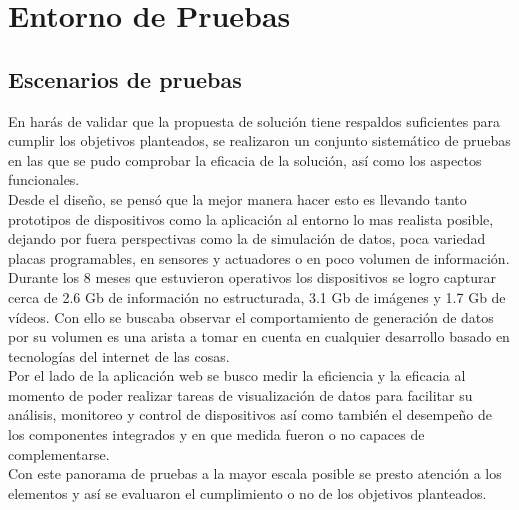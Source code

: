 

\chapter{ Entorno de Pruebas}
\section{Escenarios de pruebas}
En harás de validar que la propuesta de solución tiene respaldos suficientes para cumplir los objetivos planteados, se realizaron un conjunto sistemático de pruebas en las que se pudo comprobar la eficacia de la solución, así como los aspectos funcionales.\\

Desde el diseño, se pensó que la mejor manera hacer esto es llevando tanto prototipos de dispositivos como la aplicación al entorno lo mas realista posible, dejando por fuera perspectivas como la de simulación de datos, poca variedad placas programables, en sensores y actuadores o en poco volumen de información.\\

Durante los 8 meses que estuvieron operativos los dispositivos se logro capturar cerca de 2.6 Gb de información no estructurada, 3.1 Gb de imágenes y 1.7 Gb de vídeos. Con ello se buscaba observar el comportamiento de generación de datos por su volumen es una arista a tomar en cuenta en cualquier desarrollo basado en tecnologías del internet de las cosas.\\

Por el lado de la aplicación web se busco medir la eficiencia y la eficacia al momento de poder realizar tareas de visualización de datos para facilitar su análisis, monitoreo y control de dispositivos así como también el desempeño de los componentes integrados y en que medida fueron o no capaces de complementarse.\\

Con este panorama de pruebas a la mayor escala posible se presto atención a los elementos y así se evaluaron el cumplimiento o no de los objetivos planteados. 



